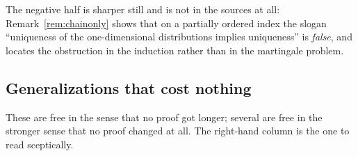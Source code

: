 \documentclass[11pt,a4paper]{article}
\theoremstyle{plain}
\theoremstyle{definition}
\theoremstyle{remark}
\begin{document}
The negative half is sharper still and is not in the sources at all:
Remark~\ref{rem:chainonly} shows that on a partially ordered index the slogan
``uniqueness of the one-dimensional distributions implies uniqueness'' is
\emph{false}, and locates the obstruction in the induction rather than in the
martingale problem.

\subsection{Generalizations that cost nothing}
\label{ssec:addedfree}

These are free in the sense that no proof got longer; several are free in the
stronger sense that no proof changed at all.  The right-hand column is the one
to read sceptically.

\medskip
\noindent
\end{document}
